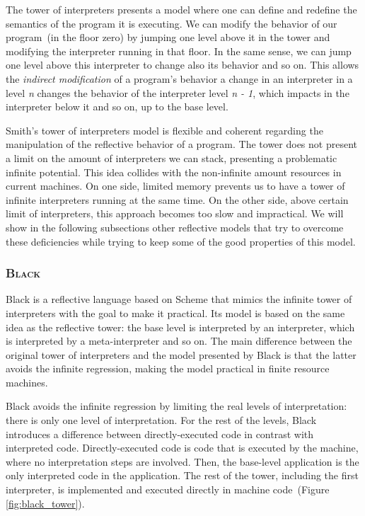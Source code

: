 The tower of interpreters presents a model where one can define and redefine the semantics of the program it is executing. We can modify the behavior of our program~(in the floor zero) by jumping one level above it in the tower and modifying the interpreter running in that floor. In the same sense, we can jump one level above this interpreter to change also its behavior and so on. This allows the \emph{indirect modification} of a program's behavior \ie a change in an interpreter in a level \emph{n} changes the behavior of the interpreter level \emph{n - 1}, which impacts in the interpreter below it and so on, up to the base level.

Smith's tower of interpreters model is flexible and coherent regarding the manipulation of the reflective behavior of a program. The tower does not present a limit on the amount of interpreters we can stack, presenting a problematic infinite potential. This idea collides with the non-infinite amount resources in current machines. On one side, limited memory prevents us to have a tower of infinite interpreters running at the same time. On the other side, above certain limit of interpreters, this approach becomes too slow and impractical. We will show in the following subsections other reflective models that try to overcome these deficiencies while trying to keep some of the good properties of this model.

\subsubsection*{\textsc{Black}}

Black is a reflective language based on Scheme that mimics the infinite tower of interpreters with the goal to make it practical. Its model is based on the same idea as the reflective tower: the base level is interpreted by an interpreter, which is interpreted by a meta-interpreter and so on. The main difference between the original tower of interpreters and the model presented by Black is that the latter avoids the infinite regression, making the model practical in finite resource machines.

Black avoids the infinite regression by limiting the real levels of interpretation: there is only one level of interpretation. For the rest of the levels, Black  introduces a difference between directly-executed code in contrast with interpreted code. Directly-executed code is code that is executed by the machine, where no interpretation steps are involved. Then, the base-level application is the only interpreted code in the application. The rest of the tower, including the first interpreter, is implemented and executed directly in machine code~(Figure \ref{fig:black_tower}).

